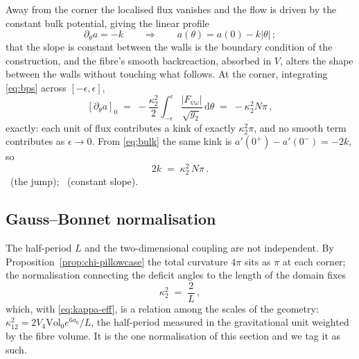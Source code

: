 Away from the corner the localised flux vanishes and the flow is driven by
the constant bulk potential, giving the linear profile
\begin{equation}\label{eq:bulk}
  \partial_{\theta}a=-k\qquad\Longrightarrow\qquad a(\theta)=a(0)-k\lvert\theta\rvert\,;
\end{equation}
that the slope is constant between the walls is the boundary condition of
the construction, and the fibre's smooth backreaction, absorbed in $V$,
alters the shape between the walls without touching what follows. At the
corner, integrating \eqref{eq:bps} across $[-\epsilon,\epsilon]$,
\begin{equation}\label{eq:kink}
  [\partial_{\theta}a]_{0}\;=\;-\frac{\kappa_{2}^{2}}{2}\int_{-\epsilon}^{\epsilon}\frac{\lvert F_{\psi\omega}\rvert}{\sqrt{g_{2}}}\,\mathrm{d}\theta
  \;=\;-\kappa_{2}^{2}N\pi\,,
\end{equation}
exactly: each unit of flux contributes a kink of exactly $\kappa_{2}^{2}\pi$,
and no smooth term contributes as $\epsilon\to0$. From \eqref{eq:bulk} the
same kink is $a'(0^{+})-a'(0^{-})=-2k$, so
\begin{equation}\label{eq:balance}
  2k\;=\;\kappa_{2}^{2}\,N\pi\,.
\end{equation}
\rigR\ (the jump); \rigD\ (constant slope).

\subsection{Gauss--Bonnet normalisation}\label{sec:gb}

The half-period $L$ and the two-dimensional coupling are not independent.
By Proposition~\ref{prop:chi-pillowcase} the total curvature $4\pi$ sits as
$\pi$ at each corner; the normalisation connecting the deficit angles to
the length of the domain fixes
\begin{equation}\label{eq:kappa-fix}
  \kappa_{2}^{2}\;=\;\frac{2}{L}\,,
\end{equation}
which, with \eqref{eq:kappa-eff}, is a relation among the scales of the
geometry: $\kappa_{12}^{2}=2V_{4}\mathrm{Vol}_{0}e^{6a_{0}}/L$, the
half-period measured in the gravitational unit weighted by the fibre
volume. It is the one normalisation of this section and we tag it as
such. \rigD

